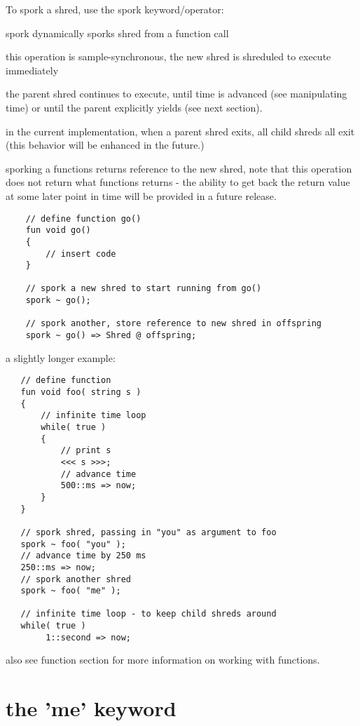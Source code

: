 To spork a shred, use the spork keyword/operator:
\begin{chuckitemize}
\item spork dynamically sporks shred from a function call
\item  this operation is sample-synchronous, the new shred is shreduled to execute immediately
\item  the parent shred continues to execute, until time is advanced (see manipulating time) or until the parent explicitly yields (see next section).
\item  in the current implementation, when a parent shred exits, all child shreds all exit (this behavior will be enhanced in the future.)
\item sporking a functions returns reference to the new shred, note that this operation does not return what functions returns - the ability to get back the return value at some later point in time will be provided in a future release.
\end{chuckitemize}
\begin{verbatim}
    // define function go()
    fun void go()
    {
        // insert code
    }

    // spork a new shred to start running from go()
    spork ~ go();

    // spork another, store reference to new shred in offspring
    spork ~ go() => Shred @ offspring;
\end{verbatim}

a slightly longer example:
\begin{verbatim}
   // define function
   fun void foo( string s )
   {
       // infinite time loop
       while( true )
       {
           // print s
           <<< s >>>;
           // advance time
           500::ms => now;
       }
   }
   
   // spork shred, passing in "you" as argument to foo
   spork ~ foo( "you" );
   // advance time by 250 ms
   250::ms => now;
   // spork another shred
   spork ~ foo( "me" );
   
   // infinite time loop - to keep child shreds around
   while( true )
        1::second => now;
\end{verbatim}

also see function section for more information on working with functions.
 

\section{the 'me' keyword}

